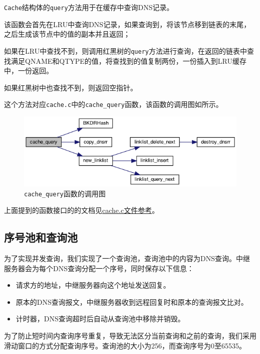 \documentclass[lang=cn,11pt,a4paper,cite=authornum]{paper}
\begin{document}
\texttt{Cache}结构体的\texttt{query}方法用于在缓存中查询DNS记录。

该函数会首先在LRU中查询DNS记录，如果查询到，将该节点移到链表的末尾，之后生成该节点中的值的副本并且返回；

如果在LRU中查找不到，则调用红黑树的\texttt{query}方法进行查询，在返回的链表中查找满足QNAME和QTYPE的值，将查找到的值复制两份，一份插入到LRU缓存中，一份返回。

如果红黑树中也查找不到，则返回空指针。

这个方法对应\texttt{cache.c}中的\texttt{cache_query}函数，该函数的调用图如所示。

\begin{figure}[htbp]

    \centering
    \includegraphics[width=0.8\linewidth]{./APIdoc/cache_8c_a1abbd81313d8d7e8b25446d7921121e0_cgraph.png}
    \caption{\texttt{cache_query}函数的调用图\label{fig:cache_query_call}}

\end{figure}

上面提到的函数接口的的文档见\href{run:./APIdoc/cache_8c.html}{cache.c文件参考}。

\subsection{序号池和查询池}

为了实现并发查询，我们实现了一个查询池，查询池中的内容为DNS查询。中继服务器会为每个DNS查询分配一个序号，同时保存以下信息：

\begin{itemize}
    \item 请求方的地址，中继服务器向这个地址发送回复。
    \item 原本的DNS查询报文，中继服务器收到远程回复时和原本的查询报文比对。
    \item 计时器，DNS查询超时后自动从查询池中移除并销毁。
\end{itemize}

为了防止短时间内查询序号重复，导致无法区分当前查询和之前的查询，我们采用滑动窗口的方式分配查询序号。查询池的大小为256，而查询序号为0至65535。
\end{document}
